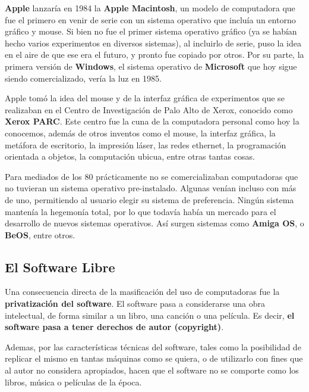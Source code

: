  \textbf{Apple} lanzaría en
1984 la \textbf{Apple Macintosh}, un modelo de computadora que fue el primero en
venir de serie con un sistema operativo que incluía un entorno gráfico y mouse.
Si bien no fue el primer sistema operativo gráfico (ya se habían hecho varios
experimentos en diversos sistemas), al incluirlo de serie, puso la idea en el
aire de que ese era el futuro, y pronto fue copiado por otros. Por su parte, la
primera versión de \textbf{Windows}, el sistema operativo de \textbf{Microsoft}
que hoy sigue siendo comercializado, vería la luz en 1985.

\begin{knowwhat} Apple tomó la idea del mouse y de la interfaz
    gráfica de experimentos que se realizaban en el Centro de Investigación de
    Palo Alto de Xerox, conocido como \textbf{Xerox PARC}. Este centro fue la
    cuna de la computadora personal como hoy la conocemos, además de otros
    inventos como el mouse, la interfaz gráfica, la metáfora de escritorio, la
    impresión láser, las redes ethernet, la programación orientada a objetos, la
    computación ubicua, entre otras tantas cosas.\autocite{haltzik_2000}
\end{knowwhat}

 Para mediados de los 80 prácticamente no se
comercializaban computadoras que no tuvieran un sistema operativo pre-instalado.
Algunas venían incluso con más de uno, permitiendo al usuario elegir su sistema
de preferencia. Ningún sistema mantenía la hegemonía total, por lo que todavía
había un mercado para el desarrollo de nuevos sistemas operativos. Así surgen
sistemas como \textbf{Amiga OS}, o \textbf{BeOS}, entre otros.

\subsection{El Software Libre}
\label{chap:historia_computadoras:subsec:software_libre}

Una consecuencia directa de la masificación del uso de computadoras fue la
\textbf{privatización del software}. El software pasa a considerarse una obra
intelectual, de forma similar a un libro, una canción o una película. Es decir,
\textbf{el software pasa a tener derechos de autor (copyright)}.

Ademas, por las características técnicas del software, tales como la posibilidad
de replicar el mismo en tantas máquinas como se quiera, o de utilizarlo con
fines que al autor no considera apropiados, hacen que el software no se comporte
como los libros, música o películas de la época.

